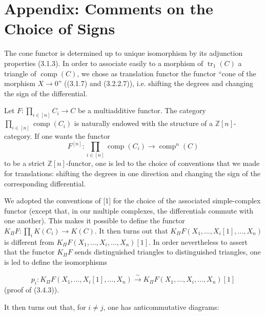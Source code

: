 \clearpage
{}%
\begingroup
\small
\setlength{\abovedisplayskip}{4pt plus 2pt minus 2pt}%
\setlength{\belowdisplayskip}{4pt plus 2pt minus 2pt}%

\section*{Appendix: Comments on the Choice of Signs}

The cone functor is determined up to unique isomorphism by its adjunction
properties (3.1.3). In order to associate easily to a morphism of
$\operatorname{tr}_1(C)$ a triangle of $\operatorname{comp}(C)$, we chose as
translation functor the functor “cone of the morphism
$X\longrightarrow 0$” ((3.1.7) and (3.2.2.7)), i.e. shifting the degrees and
changing the sign of the differential.

Let $F\colon\prod_{i\in[n]}C_i\longrightarrow C$ be a multiadditive functor.
The category $\prod_{i\in[n]}\operatorname{comp}(C_i)$ is naturally endowed
with the structure of a $\mathbb Z[n]$-category. If one wants the functor
\[
  F^{[n]}\colon\prod_{i\in[n]}\operatorname{comp}(C_i)
  \longrightarrow\operatorname{comp}^{n}(C)
\]
to be a strict $\mathbb Z[n]$-functor, one is led to the choice of
conventions that we made for translations: shifting the degrees in one
direction and changing the sign of the corresponding differential.

We adopted the conventions of [1] for the choice of the associated
simple-complex functor (except that, in our multiple complexes, the
differentials commute with one another). This makes it possible to define the
functor $K_{\Pi}F\colon\prod_i K(C_i)\longrightarrow K(C)$. It then turns out
that $K_{\Pi}F(X_1,\ldots,X_i[1],\ldots,X_n)$ is different from
$K_{\Pi}F(X_1,\ldots,X_i,\ldots,X_n)[1]$. In order nevertheless to assert
that the functor $K_{\Pi}F$ sends distinguished triangles to distinguished
triangles, one is led to define the isomorphisms

\[
  p_i\colon K_{\Pi}F(X_1,\ldots,X_i[1],\ldots,X_n)
  \xrightarrow{\ \sim\ }
  K_{\Pi}F(X_1,\ldots,X_i,\ldots,X_n)[1]
\]
(proof of (3.4.3)).

It then turns out that, for $i\ne j$, one has anticommutative diagrams:

